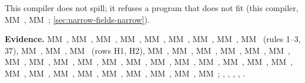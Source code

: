 This compiler does not spill; it refuses a program that does not fit (this compiler, MM~,
MM~; \cref{sec:narrow-fields-narrow}).

\textbf{Evidence.} MM~, MM~, MM~, MM~, MM~, MM~, MM~, MM~,
MM~ (rules 1–3, 37), MM~, MM~, MM~ (rows H1, H2), MM~, MM~,
MM~, MM~, MM~, MM~, MM~, MM~, MM~,
MM~, MM~, MM~, MM~, MM~, MM~, MM~,
MM~, MM~, MM~, MM~, MM~, MM~,
MM~, MM~, MM~, MM~, MM~; ,
, , , .

